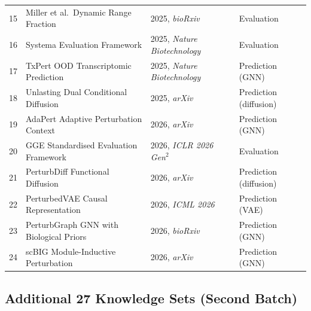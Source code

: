 \documentclass[12pt, a4paper]{article}
\begin{document}
\begin{longtable}{@{}p{0.5cm}p{5.4cm}p{3.2cm}p{3.6cm}@{}}
15 & Miller et al.\ Dynamic Range Fraction         & 2025, \textit{bioRxiv}              & Evaluation \\
16 & Systema Evaluation Framework                  & 2025, \textit{Nature Biotechnology} & Evaluation \\
17 & TxPert OOD Transcriptomic Prediction          & 2025, \textit{Nature Biotechnology} & Prediction (GNN) \\
18 & Unlasting Dual Conditional Diffusion          & 2025, \textit{arXiv}                & Prediction (diffusion) \\
19 & AdaPert Adaptive Perturbation Context         & 2026, \textit{arXiv}                & Prediction (GNN) \\
20 & GGE Standardised Evaluation Framework         & 2026, \textit{ICLR 2026 Gen$^2$}   & Evaluation \\
21 & PerturbDiff Functional Diffusion              & 2026, \textit{arXiv}                & Prediction (diffusion) \\
22 & PerturbedVAE Causal Representation            & 2026, \textit{ICML 2026}            & Prediction (VAE) \\
23 & PerturbGraph GNN with Biological Priors       & 2026, \textit{bioRxiv}              & Prediction (GNN) \\
24 & scBIG Module-Inductive Perturbation           & 2026, \textit{arXiv}                & Prediction (GNN) \\
\end{longtable}

\subsection{Additional 27 Knowledge Sets (Second Batch)}
\end{document}
